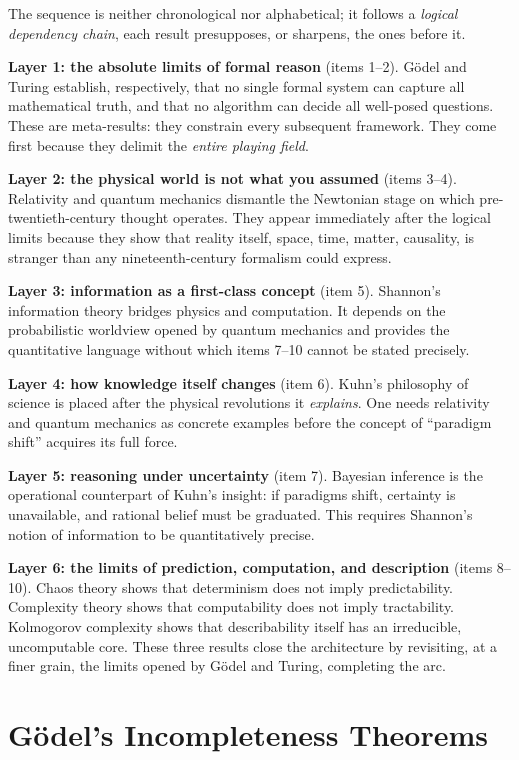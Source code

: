 The sequence is neither chronological nor alphabetical; it follows a \emph{logical dependency chain}, each result presupposes, or sharpens, the ones before it.

\textbf{Layer 1: the absolute limits of formal reason} (items 1--2). G\"odel and Turing establish, respectively, that no single formal system can capture all mathematical truth, and that no algorithm can decide all well-posed questions. These are meta-results: they constrain every subsequent framework. They come first because they delimit the \emph{entire playing field}.

\textbf{Layer 2: the physical world is not what you assumed} (items 3--4). Relativity and quantum mechanics dismantle the Newtonian stage on which pre-twentieth-century thought operates. They appear immediately after the logical limits because they show that reality itself, space, time, matter, causality, is stranger than any nineteenth-century formalism could express.

\textbf{Layer 3: information as a first-class concept} (item 5). Shannon's information theory bridges physics and computation. It depends on the probabilistic worldview opened by quantum mechanics and provides the quantitative language without which items 7--10 cannot be stated precisely.

\textbf{Layer 4: how knowledge itself changes} (item 6). Kuhn's philosophy of science is placed after the physical revolutions it \emph{explains}. One needs relativity and quantum mechanics as concrete examples before the concept of ``paradigm shift'' acquires its full force.

\textbf{Layer 5: reasoning under uncertainty} (item 7). Bayesian inference is the operational counterpart of Kuhn's insight: if paradigms shift, certainty is unavailable, and rational belief must be graduated. This requires Shannon's notion of information to be quantitatively precise.

\textbf{Layer 6: the limits of prediction, computation, and description} (items 8--10). Chaos theory shows that determinism does not imply predictability. Complexity theory shows that computability does not imply tractability. Kolmogorov complexity shows that describability itself has an irreducible, uncomputable core. These three results close the architecture by revisiting, at a finer grain, the limits opened by G\"odel and Turing, completing the arc.

\section{G\"odel's Incompleteness Theorems}

